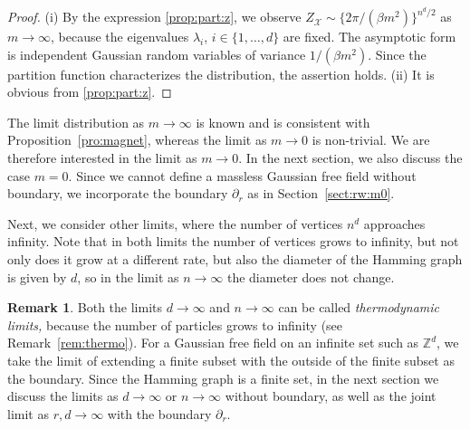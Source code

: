 \documentclass[a4paper,11pt]{article}
\theoremstyle{plain}
\theoremstyle{definition}
\newtheorem{remark}[theorem]{Remark}
\begin{document}
\begin{proof}
  (i) By the expression \eqref{prop:part:z}, we
  observe $Z_\mathcal{X}\sim\{2\pi/(\beta m^2)\}^{n^d/2}$
  as $m\to\infty$, because the eigenvalues
    $\lambda_i$, $i\in\{1,\ldots,d\}$ are fixed.
  The asymptotic form is independent Gaussian random
  variables of variance $1/(\beta m^2)$. Since
  the partition function characterizes the distribution,
  the assertion holds. (ii) It is obvious from
  \eqref{prop:part:z}.
\end{proof}

The limit distribution as $m\to\infty$ is known
and is consistent with Proposition~\ref{pro:magnet},
whereas the limit as $m\to 0$ is non-trivial.
We are therefore interested in the limit as $m\to 0$.
In the next section, we also discuss the case $m=0$.
Since we cannot define a massless Gaussian free field
without boundary, we incorporate the boundary $\partial_r$
as in Section~\ref{sect:rw:m0}.

Next, we consider other limits, where the number
of vertices $n^d$ approaches infinity. Note that in
both limits the number of vertices grows to infinity,
but not only does it grow at a different rate,
but also the diameter of the Hamming graph is given
by $d$, so in the limit as $n\to\infty$ the diameter
does not change.

\begin{remark}\label{rem:thermo_lim}
  Both the limits $d\to\infty$ and $n\to\infty$
  can be called {\it thermodynamic limits,}
  because the number of particles grows to
  infinity (see Remark~\ref{rem:thermo}).
  For a Gaussian free field on an infinite set such
  as $\mathbb{Z}^d$, we take the limit of extending
  a finite subset with the outside of the finite
  subset as the boundary. Since the Hamming graph is
  a finite set, in the next section we discuss
  the limits as $d\to\infty$ or $n\to\infty$ without
  boundary, as well as the joint limit as $r,d\to\infty$
  with the boundary $\partial_r$.
\end{remark}
\end{document}

